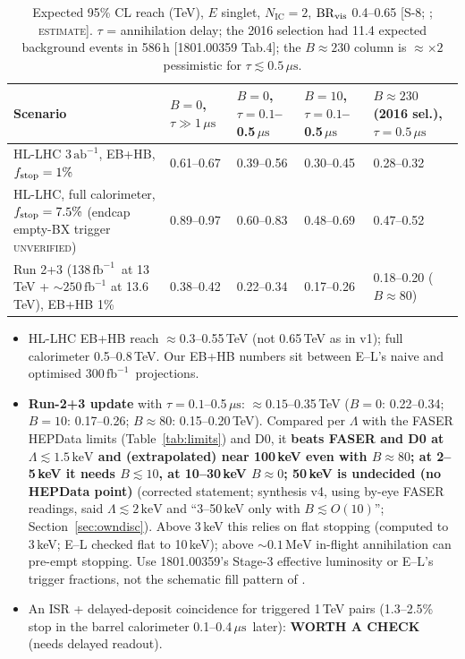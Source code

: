 \documentclass[11pt,a4paper]{article}
\newcommand{\EST}{\textsc{estimate}}
\newcommand{\UNV}{\textsc{unverified}}
\DeclareRobustCommand{\file}[1]{\path{#1}}
\newcommand{\NIC}{N_{\mathrm{IC}}}
\newcommand{\keV}{\ensuremath{\,\mathrm{keV}}}
\newcommand{\MeV}{\ensuremath{\,\mathrm{MeV}}}
\newcommand{\fbinv}{\ensuremath{\,\mathrm{fb}^{-1}}}
\newcommand{\abinv}{\ensuremath{\,\mathrm{ab}^{-1}}}
\newcommand{\mus}{\ensuremath{\,\mu\mathrm{s}}}
\newcommand{\src}[1]{{\color{mid}[#1]}}
\newcommand{\WAC}{\textcolor{warn}{\textbf{WORTH A CHECK}}}
\begin{document}
{\small
\begin{longtable}{@{}L{5.2cm}L{2.4cm}L{2.5cm}L{2.5cm}L{3.1cm}@{}}
\caption{Expected 95\% CL reach (TeV), $E$ singlet, $\NIC=2$, ${\rm BR}_{\rm vis}$ 0.4--0.65 \src{S-8; \file{F1_stopped.py}; \EST{}}. $\tau$ = annihilation delay; the 2016 selection had 11.4 expected background events in 586\,h [1801.00359 Tab.4]; the $B\approx230$ column is $\approx\times2$ pessimistic for $\tau\lesssim0.5\mus$.}\label{tab:stopped}\\
\toprule Scenario & $B=0$, $\tau\gg1\mus$ & $B=0$, $\tau=0.1$--0.5\mus & $B=10$, $\tau=0.1$--0.5\mus & $B\approx230$ (2016 sel.), $\tau=0.5\mus$\\\midrule\endfirsthead
\bottomrule\endfoot
HL-LHC 3\abinv, EB+HB, $f_{\rm stop}=1\%$ & 0.61--0.67 & 0.39--0.56 & 0.30--0.45 & 0.28--0.32\\
HL-LHC, full calorimeter, $f_{\rm stop}=7.5\%$ (endcap empty-BX trigger \UNV{}) & 0.89--0.97 & 0.60--0.83 & 0.48--0.69 & 0.47--0.52\\
Run 2+3 (138\fbinv\ at 13\,TeV + $\sim250\fbinv$ at 13.6\,TeV), EB+HB 1\% & 0.38--0.42 & 0.22--0.34 & 0.17--0.26 & 0.18--0.20 ($B\approx80$)\\
\end{longtable}
}
\begin{itemize}
\item HL-LHC EB+HB reach $\approx0.3$--0.55\,TeV (not 0.65\,TeV as in v1); full calorimeter 0.5--0.8\,TeV. Our EB+HB numbers sit between E--L's naive and optimised 300\fbinv\ projections.
\item \textbf{Run-2+3 update} with $\tau=0.1$--0.5\mus: $\approx0.15$--0.35\,TeV ($B=0$: 0.22--0.34; $B=10$: 0.17--0.26; $B\approx80$: 0.15--0.20\,TeV). Compared per $\Lambda$ with the FASER HEPData limits (Table~\ref{tab:limits}) and D0, it \textbf{beats FASER and D0 at $\Lambda\lesssim1.5\keV$ and (extrapolated) near 100\,keV even with $B\approx80$; at 2--5\,keV it needs $B\lesssim10$, at 10--30\,keV $B\approx0$; 50\,keV is undecided (no HEPData point)} (corrected statement; synthesis v4, using by-eye FASER readings, said $\Lambda\lesssim2\keV$ and ``3--50\,keV only with $B\lesssim O(10)$''; Section~\ref{sec:owndisc}). Above 3\,keV this relies on flat stopping (computed to 3\,keV; E--L checked flat to 10\,keV); above $\sim0.1\MeV$ in-flight annihilation can pre-empt stopping. Use 1801.00359's Stage-3 effective luminosity or E--L's trigger fractions, not the schematic fill pattern of \file{F1_stopped.py}.
\item An ISR + delayed-deposit coincidence for triggered 1\,TeV pairs (1.3--2.5\% stop in the barrel calorimeter 0.1--0.4\mus\ later): \WAC{} (needs delayed readout).
\end{itemize}
\end{document}
